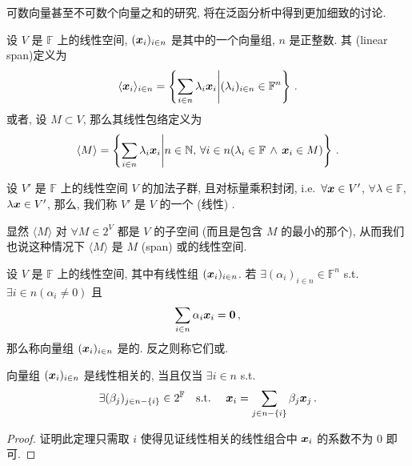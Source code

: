 \documentclass[openany, a5paper, oneside]{ctexbook}
\begin{document}
可数向量甚至不可数个向量之和的研究, 将在泛函分析中得到更加细致的讨论.

\begin{definition}[线性包络]
	设 $V$ 是 $\mathbb F$ 上的线性空间, $(\boldsymbol{x}_i)_{i\in n}$ 是其中的一个向量组, $n$ 是正整数. 
	其 (linear span)定义为 
	\begin{equation*}
		\langle \boldsymbol{x}_i\rangle_{i \in n}
		= \left\{ 
			\sum_{i \in n} \lambda_i \boldsymbol{x}_i 
		\middle|
			(\lambda_i)_{i \in n} \in \mathbb F^n
		\right\}\,.
	\end{equation*}
	或者, 设 $M \subset V$, 那么其线性包络定义为
	\begin{equation*}
		\langle M \rangle 
		= \left\{ 
			\sum_{i \in n} \lambda_i \boldsymbol{x}_i
		\middle|
			n \in \mathbb N,\, \forall i \in n (\lambda_i \in \mathbb F\, \wedge \, \boldsymbol{x}_i \in M)  
		\right\}\,.
	\end{equation*}
\end{definition}

\begin{definition}[子空间]
	设 $V'$ 是 $\mathbb F$ 上的线性空间 $V$ 的加法子群, 且对标量乘积封闭, i.e.\ $\forall \boldsymbol{x} \in V'$, $\forall \lambda \in \mathbb F$, $\lambda \boldsymbol{x} \in V'$, 那么, 我们称 $V'$ 是 $V$ 的一个 (线性) .
\end{definition}

显然 $\langle M \rangle$ 对 $\forall M \in 2^V$ 都是 $V$ 的子空间 (而且是包含 $M$ 的最小的那个), 从而我们也说这种情况下 $\langle M \rangle$ 是 $M$  (span) 或的线性空间.

\begin{definition}[线性相关]
	设 $V$ 是 $\mathbb F$ 上的线性空间, 其中有线性组 $(\boldsymbol{x}_i)_{i \in n}$. 
	若 $\exists (\alpha_i)_{i\in n} \in \mathbb F^n$ s.t.\ $\exists i \in n (\alpha_i \neq 0)$ 且
	\begin{equation*}
		\sum_{i \in n} \alpha_i \boldsymbol{x}_i = \boldsymbol{0}\,,
	\end{equation*}
	那么称向量组 $(\boldsymbol{x}_i)_{i \in n}$ 是的. 
	反之则称它们或.
\end{definition}

\begin{theorem}\label{theorem: 线性相关IFF线性组合}
	向量组 $(\boldsymbol{x}_i)_{i \in n}$ 是线性相关的, 当且仅当 $\exists i \in n$ s.t.\ 
	\begin{equation*}
		\exists (\beta_j)_{j \in n - \{i\}} \in 2^\mathbb F 
		\quad\text{s.t.\ }\quad 
			\boldsymbol{x}_i = \sum_{j \in n - \{i\}} \beta_j \boldsymbol{x}_j
		\,.
	\end{equation*}
\end{theorem}
\begin{proof}
	证明此定理只需取 $i$ 使得见证线性相关的线性组合中 $\boldsymbol{x}_i$ 的系数不为 $0$ 即可.
\end{proof}
\end{document}
